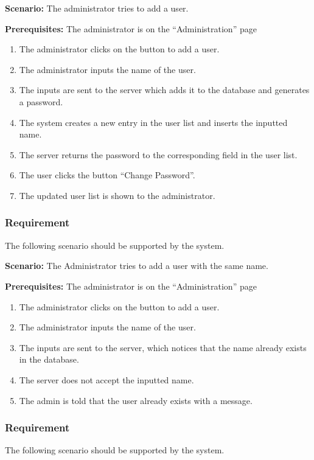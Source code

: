\documentclass{article}
\begin{document}
\textbf{Scenario:} The administrator tries to add a user.

\textbf{Prerequisites:} The administrator is on the “Administration” page

\begin{enumerate}
    \item The administrator clicks on the button to add a user.
    \item The administrator inputs the name of the user.
    \item The inputs are sent to the server which adds it to the database and generates a password.
    \item The system creates a new entry in the user list and inserts the inputted name.
    \item The server returns the password to the corresponding field in the user list.
    \item The user clicks the button “Change Password”.
    \item The updated user list is shown to the administrator.
\end{enumerate}

\subsubsection{Requirement}
The following scenario should be supported by the system.

\textbf{Scenario:} The Administrator tries to add a user with the same name.

\textbf{Prerequisites:} The administrator is on the “Administration” page

\begin{enumerate}
    \item The administrator clicks on the button to add a user.
    \item The administrator inputs the name of the user.
    \item The inputs are sent to the server, which notices that the name already exists in the database.
    \item The server does not accept the inputted name.
    \item The admin is told that the user already exists with a message.
\end{enumerate}

\subsubsection{Requirement}
The following scenario should be supported by the system.
\end{document}
